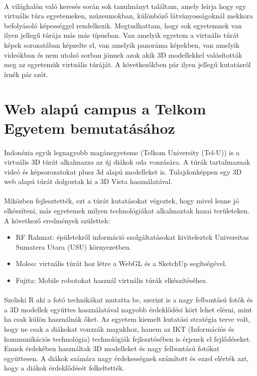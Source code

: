 \paragraph{}
A világhalón való keresés során sok tanulmányt találtam, amely leírja hogy egy virtuális túra egyetemeken, múzeumokban, különböző látványosságoknál mekkora befolyásoló képességgel rendelkezik. Megtudhattam, hogy sok egyetemnek van ilyen jellegű túrája más más típusban. Van amelyik egyetem a virtuális túrát képek sorozatában képzelte el, van amelyik panoráma képekben, van amelyik videókban és nem utolsó sorban jönnek azok akik 3D modellekkel valósították meg az egyetemük virtuális túráját. A következőkben pár ilyen jellegű kutatásról írnék pár szót.

\section{Web alapú campus a Telkom Egyetem bemutatásához}
\paragraph{}
Indonézia egyik legnagyobb magánegyeteme (Telkom University (Tel-U)) is a virtuális 3D túrát alkalmazza az új diákok oda vonzására. A túrák tartalmaznak videó és képsorozatokat plusz 3d alapú modelleket is. Tulajdonképpen egy 3D web alapú túrát dolgoztak ki a 3D Vista használatával. 
\paragraph{}
Miközben fejlesztették, ezt a túrát kutatásokat végeztek, hogy mivel lenne jó elkészíteni, más egyetemek milyen technológiákat alkalmaztak hazai területeken. A következő eredmények születtek: 
\begin{itemize}
	\item RF Rahmat: épületekről információ szolgáltatásokat kiviteleztek Universitas Sumatera Utara (USU) környezetben.
	\item Moloo: virtuális túrát hoz létre a WebGL és a SketchUp segítségével.
	\item Fujita: Mobile robotokat használ virtuális túrák elkészítéséhez.
	
\end{itemize}
\paragraph{}
Szeliski R aki a fotó technikákat mutatta be, szerint is a nagy felbontású fotók és a 3D modellek együttes használatával nagyobb érdeklődési kört lehet elérni, mint ha csak külön használnák őket. 
Az egyetem kiemelt kutatási stratégia terve volt, hogy ne csak a diákokat vonzzák magukhoz, hanem az IKT (Információs és kommunikációs technológia) technológiák fejlesztésében is érjenek el fejlődéseket. Ennek érdekében használtak 3D modelleket és nagy felbontású fotókat együttesen. A diákok számára nagy érdekességnek számított és ezzel elérték azt, hogy a diákok érdeklődését felkeltették.\cite{perdana2019implementation}


